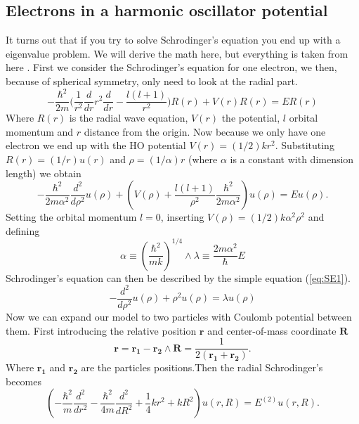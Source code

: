 \documentclass[reprint,english,notitlepage]{revtex4-1}  %
\begin{document}
\subsection{Electrons in a harmonic oscillator potential}

It turns out that if you try to solve Schrodinger's equation you end up with a eigenvalue problem. We will derive the math here, but everything is taken from here \citep{oppgavetekst}. First we consider the Schrodinger's equation for one electron, we then, because of spherical symmetry, only need to look at the radial part.
\begin{equation}
	-\frac{\hbar^2}{2m}\bigg(\frac{1}{r^2}\frac{d}{dr}r^2\frac{d}{dr}-\frac{l(l+1)}{r^2}\bigg)R(r) + V(r) R(r) = ER(r)
	\label{eq:SE}
\end{equation}
Where $R(r)$ is the radial wave equation, $V(r)$ the potential, $l$ orbital momentum and $r$ distance from the origin. Now because we only have one electron we end up with the HO potential $V(r) = (1/2)kr^2$. Substituting $R(r) = (1/r)u(r)$ and $\rho = (1/\alpha)r$ (where $\alpha$ is a constant with dimension length) we obtain
\begin{equation*}
	-\frac{\hbar^2}{2m\alpha^2}\frac{d^2}{d\rho^2}u(\rho) + \left(V(\rho) + \frac{l(l+1)}{\rho^2}\frac{\hbar^2}{2m\alpha^2}\right)u(\rho) = Eu(\rho).
\end{equation*}
Setting the orbital momentum $l=0$, inserting $V(\rho) = (1/2)k\alpha^2\rho^2$ and defining
\begin{equation*}
	\alpha \equiv \left(\frac{\hbar^2}{mk}\right)^{1/4} \wedge \lambda \equiv \frac{2m\alpha^2}{\hbar}E
\end{equation*}
Schrodinger's equation can then be described by the simple equation (\ref{eq:SE1}).
\begin{equation}
	-\frac{d^2}{d\rho^2}u(\rho)+\rho^2u(\rho) = \lambda u(\rho)
	\label{eq:SE1}
\end{equation}
Now we can expand our model to two particles with Coulomb potential between them. First introducing the relative position $\mathbf{r}$ and center-of-mass coordinate $\mathbf{R}$
\begin{equation*}
	\mathbf{r} = \mathbf{r_1} - \mathbf{r_2} \wedge \mathbf{R} = \frac{1}{2(\mathbf{r_1}+\mathbf{r_2})}.
\end{equation*}
Where $\mathbf{r_1}$ and $\mathbf{r_2}$ are the particles positions.Then the radial Schrodinger's becomes
\begin{equation*}
	\left(  -\frac{\hbar^2}{m} \frac{d^2}{dr^2} -\frac{\hbar^2}{4 m} \frac{d^2}{dR^2}+ \frac{1}{4} k r^2+  kR^2\right)u(r,R)  = E^{(2)} u(r,R).
\end{equation*}
\end{document}
